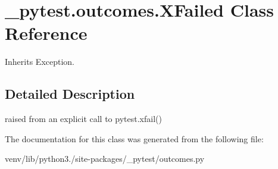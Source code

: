 \hypertarget{class__pytest_1_1outcomes_1_1_x_failed}{}\section{\+\_\+pytest.\+outcomes.\+X\+Failed Class Reference}
\label{class__pytest_1_1outcomes_1_1_x_failed}


Inherits Exception.



\subsection{Detailed Description}
\begin{DoxyVerb}raised from an explicit call to pytest.xfail() \end{DoxyVerb}
 

The documentation for this class was generated from the following file\+:\begin{DoxyCompactItemize}
\item 
venv/lib/python3./site-\/packages/\+\_\+pytest/outcomes.\+py\end{DoxyCompactItemize}
